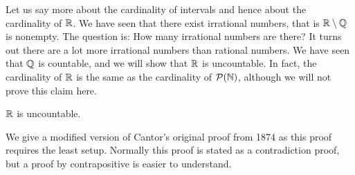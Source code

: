 Let us say more about the cardinality of intervals and hence about the
cardinality of ${\mathbb{R}}$.  We have seen that there exist irrational numbers, that is
${\mathbb{R}} \setminus {\mathbb{Q}}$ is nonempty.  The question is: How many irrational numbers
are there?  It turns out there are a lot more irrational numbers than rational
numbers.  We have seen that ${\mathbb{Q}}$ is countable, and we will show 
that ${\mathbb{R}}$ is uncountable.
In fact, the cardinality of ${\mathbb{R}}$ is the
same as the cardinality of ${\mathcal{P}}({\mathbb{N}})$, although we will not prove this
claim here.

\begin{thm}[Cantor]
${\mathbb{R}}$ is uncountable.
\end{thm}

We give a modified version of
Cantor's original proof from
1874 as this proof requires the least setup.  Normally this proof is stated
as a contradiction proof, but a proof by contrapositive is easier to
understand.

